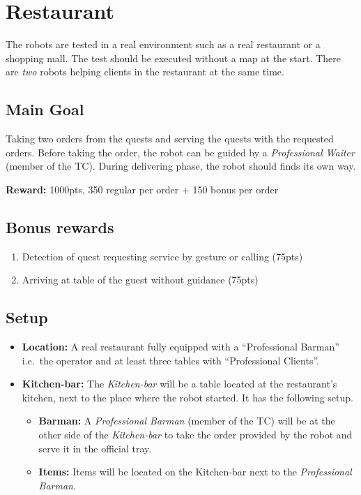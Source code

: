 \section{Restaurant}
The robots are tested in a real environment such as a real restaurant or a shopping mall. The test should be executed without a map at the start.
There are \emph{two} robots helping clients in the restaurant at the same time.


\subsection{Main Goal}
Taking two orders from the quests and serving the quests with the requested orders. Before taking the order, the robot can be guided by a \textit{Professional Waiter} (member of the TC). During delivering phase, the robot should finds its own way.

\noindent\textbf{Reward:} 1000pts, 350 regular per order + 150 bonus per order

\subsection{Bonus rewards}
\begin{enumerate}[nosep]
	\item Detection of quest requesting service by gesture or calling (75pts)
	\item Arriving at table of the guest without guidance (75pts)
\end{enumerate}

\subsection{Setup}
\begin{itemize}[nosep]
	\item \textbf{Location:} A real restaurant fully equipped with a \enquote{Professional Barman} i.e.~the operator and at least three tables with \enquote{Professional Clients}.
    \item \textbf{Kitchen-bar:} The \textit{Kitchen-bar} will be a table located at the restaurant's kitchen, next to the place where the robot started. It has the following setup.
	\begin{itemize}[nosep]
		\item \textbf{Barman:} A \textit{Professional Barman} (member of the TC) will be at the other side of the \textit{Kitchen-bar} to take the order provided by the robot and serve it in the official tray.
		\item \textbf{Items:} Items will be located on the Kitchen-bar next to the \textit{Professional Barman}.
	\end{itemize}
\end{itemize}


